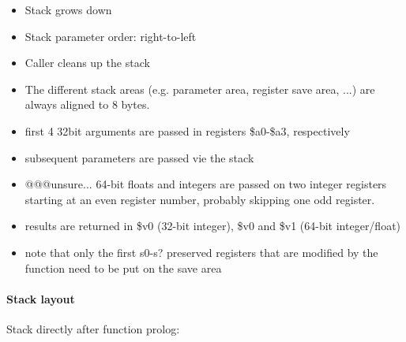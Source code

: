 \begin{itemize}
\item Stack grows down
\item Stack parameter order: right-to-left
\item Caller cleans up the stack
\item The different stack areas (e.g. parameter area, register save area, ...) are always aligned to 8 bytes.
\item first 4 32bit arguments are passed in registers \$a0-\$a3, respectively
\item subsequent parameters are passed vie the stack
\item @@@unsure... 64-bit floats and integers are passed on two integer registers starting at an even register number, probably skipping one odd register.
\item results are returned in \$v0 (32-bit integer), \$v0 and \$v1 (64-bit integer/float)
\item note that only the first s0-s? preserved registers that are modified by the function need to be put on the save area
\end{itemize}

\paragraph{Stack layout}

Stack directly after function prolog:\\

